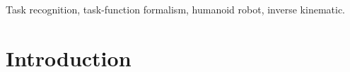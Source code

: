 \documentclass[journal]{IEEEtran}
\begin{document}
\begin{IEEEkeywords}
Task recognition, task-function formalism, humanoid robot, inverse kinematic.
\end{IEEEkeywords}

\IEEEpeerreviewmaketitle

\section{Introduction}
%
%
%
%
\end{document}
